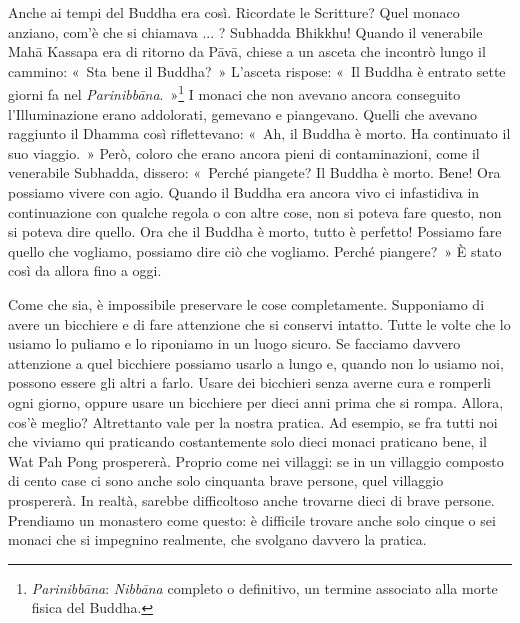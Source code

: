 Anche ai tempi del Buddha era così. Ricordate le Scritture? Quel monaco
anziano, com'è che si chiamava ... ? Subhadda Bhikkhu! Quando il
venerabile Mahā Kassapa era di ritorno da Pāvā, chiese a un asceta che
incontrò lungo il cammino: «~Sta bene il Buddha?~» L'asceta rispose:
«~Il Buddha è entrato sette giorni fa nel
\emph{Parinibbāna}.~»\footnote{\emph{Parinibbāna}: \emph{Nibbāna}
  completo o definitivo, un termine associato alla morte fisica del
  Buddha.} I monaci che non avevano ancora conseguito l'Illuminazione
erano addolorati, gemevano e piangevano. Quelli che avevano raggiunto il
Dhamma così riflettevano: «~Ah, il Buddha è morto. Ha continuato il suo
viaggio.~» Però, coloro che erano ancora pieni di contaminazioni, come
il venerabile Subhadda, dissero: «~Perché piangete? Il Buddha è morto.
Bene! Ora possiamo vivere con agio. Quando il Buddha era ancora vivo ci
infastidiva in continuazione con qualche regola o con altre cose, non si
poteva fare questo, non si poteva dire quello. Ora che il Buddha è
morto, tutto è perfetto! Possiamo fare quello che vogliamo, possiamo
dire ciò che vogliamo. Perché piangere?~» È stato così da allora fino a
oggi.

Come che sia, è impossibile preservare le cose completamente. Supponiamo
di avere un bicchiere e di fare attenzione che si conservi intatto.
Tutte le volte che lo usiamo lo puliamo e lo riponiamo in un luogo
sicuro. Se facciamo davvero attenzione a quel bicchiere possiamo usarlo
a lungo e, quando non lo usiamo noi, possono essere gli altri a farlo.
Usare dei bicchieri senza averne cura e romperli ogni giorno, oppure
usare un bicchiere per dieci anni prima che si rompa. Allora, cos'è
meglio? Altrettanto vale per la nostra pratica. Ad esempio, se fra tutti
noi che viviamo qui praticando costantemente solo dieci monaci praticano
bene, il Wat Pah Pong prospererà. Proprio come nei villaggi: se in un
villaggio composto di cento case ci sono anche solo cinquanta brave
persone, quel villaggio prospererà. In realtà, sarebbe difficoltoso
anche trovarne dieci di brave persone. Prendiamo un monastero come
questo: è difficile trovare anche solo cinque o sei monaci che si
impegnino realmente, che svolgano davvero la pratica.

